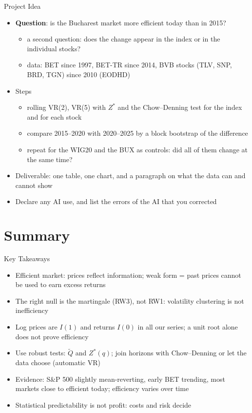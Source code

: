 \begin{frame}{Project Idea}
\itemsize{\small}
\begin{itemize}
    \item \textbf{Question}: is the Bucharest market more efficient today than in 2015?
    \begin{itemize}
        \item a second question: does the change appear in the index or in the individual stocks?
        \item data: BET since 1997, BET-TR since 2014, BVB stocks (TLV, SNP, BRD, TGN) since 2010 (EODHD)
    \end{itemize}
    \item Steps
    \begin{itemize}
        \item rolling VR(2), VR(5) with $Z^*$ and the Chow--Denning test for the index and for each stock
        \item compare 2015--2020 with 2020--2025 by a block bootstrap of the difference
        \item repeat for the WIG20 and the BUX as controls: did all of them change at the same time?
    \end{itemize}
    \item Deliverable: one table, one chart, and a paragraph on what the data can and cannot show
    \item Declare any AI use, and list the errors of the AI that you corrected
\end{itemize}
\end{frame}


\section{Summary}

\begin{frame}{Key Takeaways}
\itemsize{\small}
\begin{itemize}
    \item Efficient market: prices reflect information; weak form = past prices cannot be used to earn excess returns
    \item The right null is the martingale (RW3), not RW1: volatility clustering is not inefficiency
    \item Log prices are $I(1)$ and returns $I(0)$ in all our series; a unit root alone does not prove efficiency
    \item Use robust tests: $\tilde Q$ and $Z^*(q)$; join horizons with Chow--Denning or let the data choose (automatic VR)
    \item Evidence: S\&P 500 slightly mean-reverting, early BET trending, most markets close to efficient today; efficiency varies over time
    \item Statistical predictability is not profit: costs and risk decide
\end{itemize}
\end{frame}

